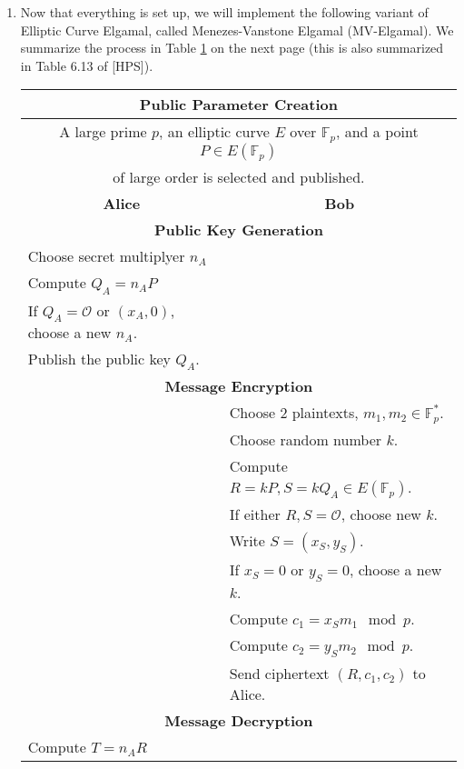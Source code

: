 \documentclass[11pt]{article}
\newcommand{\bF}{\mathbb{F}}
\newcommand{\cO}{\mathcal{O}}
\begin{document}
\begin{enumerate}
{\begin{enumerate}
{    }
  \end{enumerate}
  }
  \item{
  Now that everything is set up, we will implement the following variant of Elliptic Curve Elgamal, called Menezes-Vanstone Elgamal (MV-Elgamal).  We summarize the process in Table \ref{MVElgamal} on the next page (this is also summarized in Table 6.13 of [HPS]).
  \begin{table}\label{MVElgamal}
  \begin{center}
    \begin{tabular}{|l|l|}
      \hline
      \multicolumn{2}{|c|}{\textbf{Public Parameter Creation}}\\
      \hline
      \multicolumn{2}{|c|}{A large prime $p$, an elliptic curve $E$ over $\bF_p$, and a point $P\in E(\bF_p)$}\\
      \multicolumn{2}{|c|}{of large order is selected and published.}\\
      \hline
      \multicolumn{1}{|c|}{\textbf{Alice}} & \multicolumn{1}{|c|}{\textbf{Bob}}\\
      \hline
      \multicolumn{2}{|c|}{\textbf{Public Key Generation}}\\
      \hline
      Choose secret multiplyer $n_A$ & \\
      Compute $Q_A = n_AP$ & \\
      If $Q_A=\cO$ or $(x_A,0)$, choose a new $n_A$. & \\
      Publish the public key $Q_A$. & \\
      \hline
      \multicolumn{2}{|c|}{\textbf{Message Encryption}}\\
      \hline
      &Choose 2 plaintexts, $m_1,m_2\in\bF_p^*$.\\
      &Choose random number $k$.\\
      &Compute $R = kP,S=kQ_A\in E(\bF_p)$.\\
      &If either $R,S=\cO$, choose new $k$.\\
      &Write $S = (x_S,y_S)$.\\
      &If $x_S=0$ or $y_S=0$, choose a new $k$.\\
      &Compute $c_1 = x_Sm_1\mod p.$\\
      &Compute $c_2 = y_Sm_2\mod p.$\\
      &Send ciphertext $(R,c_1,c_2)$ to Alice.\\
      \hline
      \multicolumn{2}{|c|}{\textbf{Message Decryption}}\\
      \hline
      Compute $T = n_AR$ & \\

\end{tabular}
\end{center}
\end{table}}
\end{enumerate}
\end{document}
